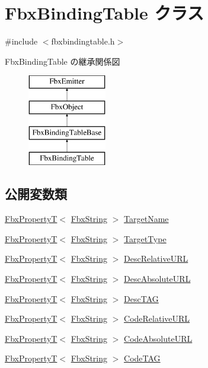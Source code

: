 \hypertarget{class_fbx_binding_table}{}\section{Fbx\+Binding\+Table クラス}
\label{class_fbx_binding_table}


{\ttfamily \#include $<$fbxbindingtable.\+h$>$}

Fbx\+Binding\+Table の継承関係図\begin{figure}[H]
\begin{center}
\leavevmode
\includegraphics[height=4.000000cm]{class_fbx_binding_table}
\end{center}
\end{figure}
\subsection*{公開変数類}
\begin{DoxyCompactItemize}
\item 
\hyperlink{class_fbx_property_t}{Fbx\+PropertyT}$<$ \hyperlink{class_fbx_string}{Fbx\+String} $>$ \hyperlink{class_fbx_binding_table_a09ebb43f4fdfafcf1842ecad60b16801}{Target\+Name}
\item 
\hyperlink{class_fbx_property_t}{Fbx\+PropertyT}$<$ \hyperlink{class_fbx_string}{Fbx\+String} $>$ \hyperlink{class_fbx_binding_table_aca964aac5ddc2238ca9d4a3cafe42486}{Target\+Type}
\item 
\hyperlink{class_fbx_property_t}{Fbx\+PropertyT}$<$ \hyperlink{class_fbx_string}{Fbx\+String} $>$ \hyperlink{class_fbx_binding_table_acb06f75ac993d6f92788beb82298775b}{Desc\+Relative\+U\+RL}
\item 
\hyperlink{class_fbx_property_t}{Fbx\+PropertyT}$<$ \hyperlink{class_fbx_string}{Fbx\+String} $>$ \hyperlink{class_fbx_binding_table_ad0c914d07b49a91d79eda8d39fda6cf7}{Desc\+Absolute\+U\+RL}
\item 
\hyperlink{class_fbx_property_t}{Fbx\+PropertyT}$<$ \hyperlink{class_fbx_string}{Fbx\+String} $>$ \hyperlink{class_fbx_binding_table_aa1ac440c2724fdc420ec3f02fa88aede}{Desc\+T\+AG}
\item 
\hyperlink{class_fbx_property_t}{Fbx\+PropertyT}$<$ \hyperlink{class_fbx_string}{Fbx\+String} $>$ \hyperlink{class_fbx_binding_table_add10ea889f7b9e37ca0fbbf27dfc140f}{Code\+Relative\+U\+RL}
\item 
\hyperlink{class_fbx_property_t}{Fbx\+PropertyT}$<$ \hyperlink{class_fbx_string}{Fbx\+String} $>$ \hyperlink{class_fbx_binding_table_a43a42110f701adae3164558d1b001275}{Code\+Absolute\+U\+RL}
\item 
\hyperlink{class_fbx_property_t}{Fbx\+PropertyT}$<$ \hyperlink{class_fbx_string}{Fbx\+String} $>$ \hyperlink{class_fbx_binding_table_ac1c73d117768ad0373d277a81e021fa3}{Code\+T\+AG}
\end{DoxyCompactItemize}
